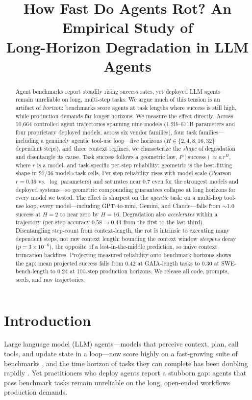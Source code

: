 \documentclass[11pt]{article}
\title{\textbf{How Fast Do Agents Rot? An Empirical Study of\\ Long-Horizon Degradation in LLM Agents}}
\author{}
\date{}
\newcommand{\rstep}{r}
\newcommand{\horizon}{H}
\begin{document}
\maketitle

\begin{abstract}
Agent benchmarks report steadily rising success rates, yet deployed LLM agents
remain unreliable on long, multi-step tasks. We argue much of this tension is an
artifact of \emph{horizon}: benchmarks score agents at task lengths where success is
still high, while production demands far longer horizons. We measure the effect
directly. Across 10{,}664 controlled agent trajectories spanning nine models
(1.2B--671B parameters and four proprietary deployed models, across six vendor
families), four task families---including a genuinely agentic tool-use loop---five
horizons ($H\!\in\!\{2,4,8,16,32\}$ dependent steps), and three context regimes, we
characterize the \emph{shape} of degradation and disentangle its cause. Task success
follows a geometric law, $P(\text{success})\approx a\,\rstep^{\horizon}$, where
$\rstep$ is a model- and task-specific per-step reliability: geometric is the
best-fitting shape in $27/36$ model$\times$task cells. Per-step reliability rises with
model scale (Pearson $r{=}0.36$ vs.\ $\log$ parameters) and saturates near $0.7$ even
for the strongest models and deployed systems---so geometric compounding guarantees
collapse at long horizons for every model we tested. The effect is sharpest on the
\emph{agentic} task: on a multi-hop tool-use loop, every model---including GPT-4o-mini,
Gemini, and Claude---falls from $\sim$1.0 success at $H{=}2$ to near zero by $H{=}16$.
Degradation also \emph{accelerates} within a trajectory (per-step accuracy $0.58\to
0.44$ from the first to the last third). Disentangling step-count from context-length,
the rot is intrinsic to executing many dependent steps, not raw context length:
bounding the context window \emph{steepens} decay ($p{=}3\times10^{-6}$), the opposite
of a lost-in-the-middle prediction, so naive context truncation backfires. Projecting
measured reliability onto benchmark horizons shows the gap: mean projected success
falls from $0.42$ at GAIA-length tasks to $0.30$ at SWE-bench-length to $0.24$ at
100-step production horizons. We release all code, prompts, seeds, and raw
trajectories.
\end{abstract}

\section{Introduction}
Large language model (LLM) agents---models that perceive context, plan, call tools,
and update state in a loop---now score highly on a fast-growing suite of benchmarks
\citep{jimenez2024swebench,yao2024taubench,zhou2023webarena,mialon2023gaia}, and the
time horizon of tasks they can complete has been doubling rapidly
\citep{kwa2025metr}. Yet practitioners who deploy agents report a stubborn gap: agents
that pass benchmark tasks remain unreliable on the long, open-ended workflows
production demands.
\end{document}

